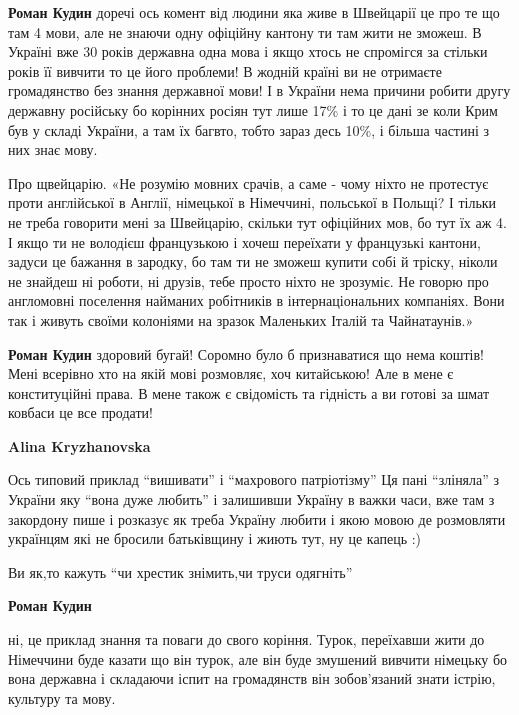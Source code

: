 \begin{itemize}
\textbf{Роман Кудин} доречі ось комент від людини яка живе в Швейцарії це про
те що там 4 мови, але не знаючи одну офіційну кантону ти там жити не зможеш. В
Україні вже 30 років державна одна мова і якщо хтось не спромігся за стільки
років її вивчити то це його проблеми! В жодній країні ви не отримаєте
громадянство без знання державної мови! І в України нема причини робити другу
державну російську бо корінних росіян тут лише 17\% і то це дані зе коли Крим
був у складі України, а там їх багвто, тобто зараз десь 10\%, і більша частині з
них знає мову.

Про щвейцарію. «Не розумію мовних срачів, а саме - чому ніхто не протестує проти
англійської в Англії, німецької в Німеччині, польської в Польщі?  І тільки не
треба говорити мені за Швейцарію, скільки тут офіційних мов, бо тут їх аж 4. І
якщо ти не володієш французькою і хочеш переїхати у французькі кантони, задуси
це бажання в зародку, бо там ти не зможеш купити собі й тріску, ніколи не
знайдеш ні роботи, ні друзів, тебе просто ніхто не зрозуміє. Не говорю про
англомовні поселення найманих робітників в інтернаціональних компаніях. Вони
так і живуть своїми колоніями на зразок Маленьких Італій та Чайнатаунів.»


\textbf{Роман Кудин} здоровий бугай! Соромно було б признаватися що нема коштів!  Мені
всерівно хто на якій мові розмовляє, хоч китайською! Але в мене є конституційні
права. В мене також є свідомість та гідність а ви готові за шмат ковбаси це все
продати!


\textbf{Alina Kryzhanovska} 

Ось типовий приклад \enquote{вишивати} і \enquote{махрового патріотізму} Ця
пані \enquote{зліняла} з України яку \enquote{вона дуже любить} і залишивши
Україну в важки часи, вже там з закордону пише і розказує як треба Україну
любити і якою мовою де розмовляти українцям які не бросили батьківщину і жиють
тут, ну це капець :)

Ви як,то кажуть \enquote{чи хрестик знімить,чи труси одягніть}

\textbf{Роман Кудин} 

ні, це приклад знання та поваги до свого коріння. Турок, переїхавши жити до
Німеччини буде казати що він турок, але він буде змушений вивчити німецьку бо
вона державна і складаючи іспит на громадянств він зобов’язаний знати істрію,
культуру та мову.


\end{itemize}
